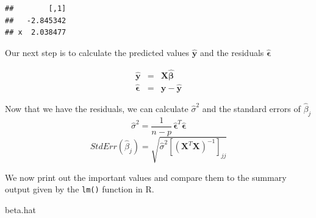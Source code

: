 \documentclass[]{book}
\newenvironment{Shaded}{\begin{snugshade}}{\end{snugshade}}
\newcommand{\KeywordTok}[1]{\textcolor[rgb]{0.13,0.29,0.53}{\textbf{{#1}}}}
\newcommand{\DecValTok}[1]{\textcolor[rgb]{0.00,0.00,0.81}{{#1}}}
\newcommand{\StringTok}[1]{\textcolor[rgb]{0.31,0.60,0.02}{{#1}}}
\newcommand{\NormalTok}[1]{{#1}}
\theoremstyle{definition}
\theoremstyle{definition}
\theoremstyle{remark}
\begin{document}
\begin{verbatim}
##        [,1]
##   -2.845342
## x  2.038477
\end{verbatim}

Our next step is to calculate the predicted values
\(\hat{\boldsymbol{y}}\) and the residuals
\(\hat{\boldsymbol{\epsilon}}\)

\begin{eqnarray*}
\hat{\boldsymbol{y}} & = & \boldsymbol{X}\hat{\boldsymbol{\beta}}\\
\hat{\boldsymbol{\epsilon}} & = & \boldsymbol{y}-\hat{\boldsymbol{y}}
\end{eqnarray*}

\begin{Shaded}
\end{Shaded}

Now that we have the residuals, we can calculate \(\hat{\sigma}^{2}\)
and the standard errors of \(\hat{\beta}_{j}\) \[
\hat{\sigma}^{2}=\frac{1}{n-p}\,\hat{\boldsymbol{\epsilon}}^{T}\hat{\boldsymbol{\epsilon}}
\] \[
StdErr\left(\hat{\beta}_{j}\right)=\sqrt{\hat{\sigma}^{2}\left[\left(\boldsymbol{X}^{T}\boldsymbol{X}\right)^{-1}\right]_{jj}}
\]

\begin{Shaded}
\end{Shaded}

We now print out the important values and compare them to the summary
output given by the \texttt{lm()} function in R.

\begin{Shaded}
\begin{Highlighting}[]
\NormalTok{beta.hat}
\end{Highlighting}
\end{Shaded}
\end{document}

